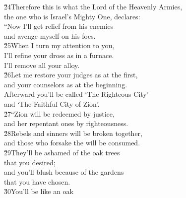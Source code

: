 \begin{poetry}
\poeml \v{24}Therefore this is what the Lord  of the Heavenly Armies, \\
\poemll    the one who is Israel's Mighty One, declares: \\
\poeml ``Now I'll get relief from his enemies \\
\poemll    and avenge myself on his foes. \\
\poeml \v{25}When I turn my attention to you, \\
\poemll    I'll refine your dross as in a furnace. \\
\poemlll       I'll remove all your alloy. \\
\poeml \v{26}Let me restore your judges as at the first, \\
\poemll    and your counselors as at the beginning. \\
\poeml Afterward you'll be called `The Righteous City' \\
\poemll    and `The Faithful City of Zion'. \\
\poeml \v{27}``Zion will be redeemed by justice, \\
\poemll    and her repentant ones by righteousness. \\
\poeml \v{28}Rebels and sinners will be broken together, \\
\poemll    and those who forsake the  will be consumed. \\
\poeml \v{29}They'll be ashamed of the oak trees \\
\poemll    that you desired; \\
\poeml and you'll blush because of the gardens \\
\poemll    that you have chosen. \\
\poeml \v{30}You'll be like an oak \\

\end{poetry}
